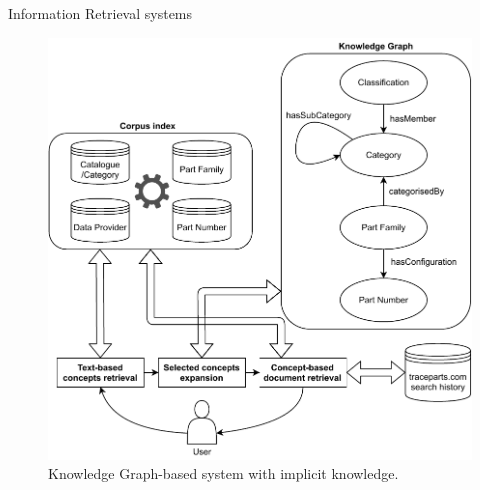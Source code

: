 \begin{frame}{Information Retrieval systems}

    \begin{figure} [H]
        \begin{center}
            \includegraphics[scale=0.45]{images/kg-based-ir-system-with-search-hist.pdf} 
            \caption{Knowledge Graph-based system with implicit knowledge.} 
        \end{center}
    \end{figure}

\end{frame}


